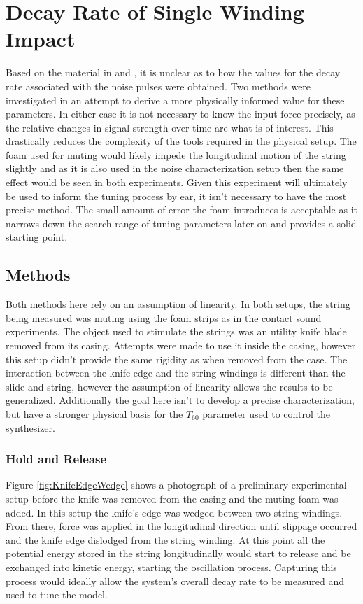 \documentclass[../main.tex]{subfiles}
\begin{document}
\section{Decay Rate of Single Winding Impact}
Based on the material in  and , it is unclear as to how the values for the decay rate associated with the noise pulses were obtained. Two methods were investigated in an attempt to derive a more physically informed value for these parameters. In either case it is not necessary to know the input force precisely, as the relative changes in signal strength over time are what is of interest. This drastically reduces the complexity of the tools required in the physical setup. The foam used for muting would likely impede the longitudinal motion of the string slightly and as it is also used in the noise characterization setup then the same effect would be seen in both experiments. Given this experiment will ultimately be used to inform the tuning process by ear, it isn't necessary to have the most precise method. The small amount of error the foam introduces is acceptable as it narrows down the search range of tuning parameters later on and provides a solid starting point.

\subsection{Methods}
Both methods here rely on an assumption of linearity. In both setups, the string being measured was muting using the foam strips as in the contact sound experiments. The object used to stimulate the strings was an utility knife blade removed from its casing. Attempts were made to use it inside the casing, however this setup didn't provide the same rigidity as when removed from the case. The interaction between the knife edge and the string windings is different than the slide and string, however the assumption of linearity  allows the results to be generalized. Additionally the goal here isn't to develop a precise characterization, but have a stronger physical basis for the $T_{60}$ parameter used to control the synthesizer. 

\subsubsection{Hold and Release}
Figure \ref{fig:KnifeEdgeWedge} shows a photograph of a preliminary experimental setup before the knife was removed from the casing and the muting foam was added. In this setup the knife's edge was wedged between two string windings. From there, force was applied in the longitudinal direction until slippage occurred and the knife edge dislodged from the string winding. At this point all the potential energy stored in the string longitudinally would start to release and be exchanged into kinetic energy, starting the oscillation process. Capturing this process would ideally allow the system's overall decay rate to be measured and used to tune the model.
\end{document}
